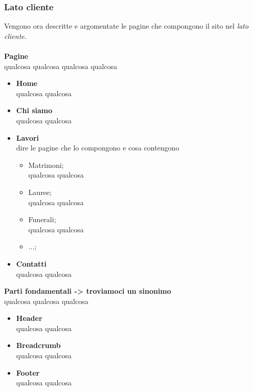 \subsubsection{Lato cliente}
Vengono ora descritte e argomentate le pagine che compongono il sito nel \textit{lato cliente}.\\\\
\textbf{Pagine}\\
qualcosa qualcosa qualcosa qualcosa	
	\begin{itemize}
		\item \textbf{Home} \\qualcosa qualcosa
		\item \textbf{Chi siamo}\\qualcosa qualcosa
		\item \textbf{Lavori}\\dire le pagine che lo compongono e cosa contengono
	 	\begin{itemize}
 			\item Matrimoni;\\	qualcosa qualcosa 
	 		\item Lauree;\\	qualcosa qualcosa 
 			\item Funerali;\\	qualcosa qualcosa
 			\item ...; 		 		
	 	\end{itemize}
	 	\item \textbf{Contatti}\\qualcosa qualcosa\\
 	\end{itemize}
\textbf{Parti fondamentali -> troviamoci un sinonimo}\\ 
	qualcosa qualcosa qualcosa
	\begin{itemize}
		\item \textbf{Header}\\qualcosa qualcosa
		\item \textbf{Breadcrumb}\\qualcosa qualcosa
		\item \textbf{Footer}\\qualcosa qualcosa
 	\end{itemize}
 		
